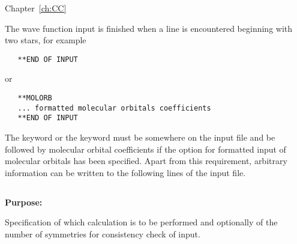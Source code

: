 Chapter~\ref{ch:CC} 

\bigskip
\noindent
The wave function input is finished when a line is encountered beginning
with two stars, for example

\begin{inputex} \begin{verbatim}
   **END OF INPUT
\end{verbatim} \end{inputex}
or

\begin{inputex} \begin{verbatim}
   **MOLORB
   ... formatted molecular orbitals coefficients
   **END OF INPUT
\end{verbatim} \end{inputex}

\noindent
The  keyword or the  keyword
must be somewhere on the input file and be
followed by molecular orbital coefficients if the option for formatted
input of molecular orbitals has been specified.  Apart from this
requirement, arbitrary information can be written to the following lines
of the input file.



\pagebreak[3]
\subsection{\label{ref-geninp}}

{\bf Purpose:}

Specification of which calculation is to be performed and
optionally of the number of symmetries for consistency check of
input.

